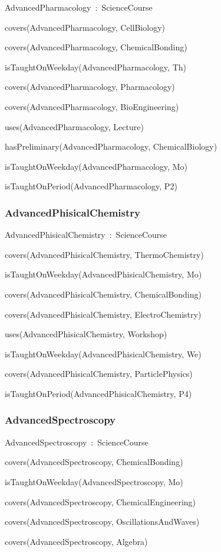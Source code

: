 \documentclass{article}
\begin{document}
AdvancedPharmacology~:~ScienceCourse

covers(AdvancedPharmacology, CellBiology)

covers(AdvancedPharmacology, ChemicalBonding)

isTaughtOnWeekday(AdvancedPharmacology, Th)

covers(AdvancedPharmacology, Pharmacology)

covers(AdvancedPharmacology, BioEngineering)

uses(AdvancedPharmacology, Lecture)

hasPreliminary(AdvancedPharmacology, ChemicalBiology)

isTaughtOnWeekday(AdvancedPharmacology, Mo)

isTaughtOnPeriod(AdvancedPharmacology, P2)

\subsubsection*{AdvancedPhisicalChemistry}

AdvancedPhisicalChemistry~:~ScienceCourse

covers(AdvancedPhisicalChemistry, ThermoChemistry)

isTaughtOnWeekday(AdvancedPhisicalChemistry, Mo)

covers(AdvancedPhisicalChemistry, ChemicalBonding)

covers(AdvancedPhisicalChemistry, ElectroChemistry)

uses(AdvancedPhisicalChemistry, Workshop)

isTaughtOnWeekday(AdvancedPhisicalChemistry, We)

covers(AdvancedPhisicalChemistry, ParticlePhysics)

isTaughtOnPeriod(AdvancedPhisicalChemistry, P4)

\subsubsection*{AdvancedSpectroscopy}

AdvancedSpectroscopy~:~ScienceCourse

covers(AdvancedSpectroscopy, ChemicalBonding)

isTaughtOnWeekday(AdvancedSpectroscopy, Mo)

covers(AdvancedSpectroscopy, ChemicalEngineering)

covers(AdvancedSpectroscopy, OscillationsAndWaves)

covers(AdvancedSpectroscopy, Algebra)
\end{document}

